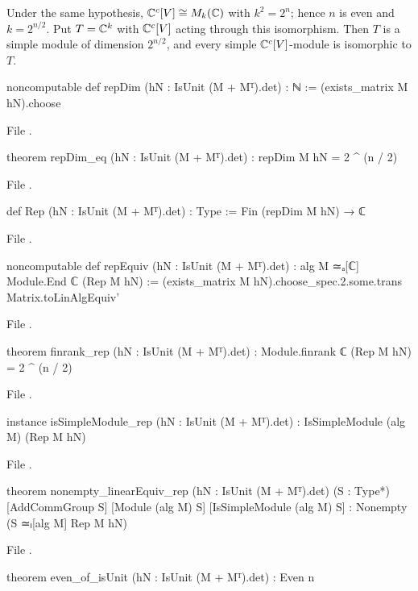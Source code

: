 \begin{theorem}\label{ch06:thm:repdim}
Under the same hypothesis, ${\mathbb{C}}^c[V]\cong M_k({\mathbb{C}})$ with $k^2=2^n$; hence $n$ is even and
$k=2^{n/2}$.  Put $T={\mathbb{C}}^k$ with ${\mathbb{C}}^c[V]$ acting through this isomorphism.  Then $T$ is a simple
module of dimension $2^{n/2}$, and every simple ${\mathbb{C}}^c[V]$-module is isomorphic to $T$.
\end{theorem}
\begin{leancode}
noncomputable def repDim (hN : IsUnit (M + Mᵀ).det) : ℕ := (exists_matrix M hN).choose
\end{leancode}
\noindent File .
\begin{leancode}
theorem repDim_eq (hN : IsUnit (M + Mᵀ).det) : repDim M hN = 2 ^ (n / 2)
\end{leancode}
\noindent File .
\begin{leancode}
def Rep (hN : IsUnit (M + Mᵀ).det) : Type := Fin (repDim M hN) → ℂ
\end{leancode}
\noindent File .
\begin{leancode}
noncomputable def repEquiv (hN : IsUnit (M + Mᵀ).det) : alg M ≃ₐ[ℂ] Module.End ℂ (Rep M hN) :=
  (exists_matrix M hN).choose_spec.2.some.trans Matrix.toLinAlgEquiv'
\end{leancode}
\noindent File .
\begin{leancode}
theorem finrank_rep (hN : IsUnit (M + Mᵀ).det) :
    Module.finrank ℂ (Rep M hN) = 2 ^ (n / 2)
\end{leancode}
\noindent File .
\begin{leancode}
instance isSimpleModule_rep (hN : IsUnit (M + Mᵀ).det) : IsSimpleModule (alg M) (Rep M hN)
\end{leancode}
\noindent File .
\begin{leancode}
theorem nonempty_linearEquiv_rep (hN : IsUnit (M + Mᵀ).det) (S : Type*) [AddCommGroup S]
    [Module (alg M) S] [IsSimpleModule (alg M) S] :
    Nonempty (S ≃ₗ[alg M] Rep M hN)
\end{leancode}
\noindent File .
\begin{leancode}
theorem even_of_isUnit (hN : IsUnit (M + Mᵀ).det) : Even n
\end{leancode}
